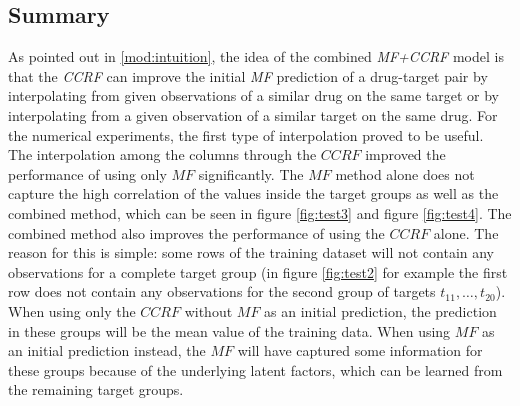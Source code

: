 \subsection{Summary}
As pointed out in \ref{mod:intuition}, the idea of the combined \textit{MF+CCRF} model is that the \textit{CCRF} can improve the initial \textit{MF} prediction of a drug-target pair by interpolating from given observations of a similar drug on the same target or by interpolating from a given observation of a similar target on the same drug. For the numerical experiments, the first type of interpolation proved to be useful. The interpolation among the columns through the $CCRF$ improved the performance of using only $MF$ significantly. The $MF$ method alone does not capture the high correlation of the values inside the target groups as well as the combined method, which can be seen in figure \ref{fig:test3} and figure \ref{fig:test4}. The combined method also improves the performance of using the $CCRF$ alone. The reason for this is simple: some rows of the training dataset will not contain any observations for a complete target group (in figure \ref{fig:test2} for example the first row does not contain any observations for the second group of targets $t_{11},\dots,t_{20}$). When using only the $CCRF$ without $MF$ as an initial prediction, the prediction in these groups will be the mean value of the training data. When using $MF$ as an initial prediction instead, the $MF$ will have captured some information for these groups because of the underlying latent factors, which can be learned from the remaining target groups.

